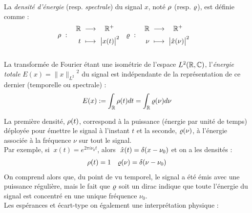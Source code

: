 \begin{definition}\label{def:densi_dE}
	La \emph{densité d'énergie} (resp. \emph{spectrale}) du signal $x$, noté $\rho$ (resp. $\varrho$), est définie comme :
	\begin{align}\label{eq:densi_dE}
		\densit\ &:\quad \begin{aligned}\R\ &\lr\quad \R^+ \\ t\ &\longmapsto\ \big|x(t)\big|^2 \end{aligned}  
		&
		\densis\ &:\quad \begin{aligned}\R\ &\lr\quad \R^+ \\ \nu\ &\longmapsto\ \big|\fou{x}(\nu)\big|^2 \end{aligned}
	\end{align}
	\\
	La transformée de Fourier étant une isométrie de l'espace $L^2(\mathbb{R},\mathbb{C})$, l'\emph{énergie totale} $E(x)={\|x\|_{L^2}}^2$ du signal est indépendante de la représentation de ce dernier (temporelle ou spectrale) :
	\begin{equation}\label{eq:parceval}
		E(x) :=  \int_{\mathbb{R}} \rho(t) dt = \int_{\mathbb{R}} \varrho(\nu) d\nu
	\end{equation}
\end{definition}
\skipl

La première densité, $\rho(t)$, correspond à la puissance (énergie par unité de temps) déployée pour émettre le signal à l'instant $t$ et la seconde, $\varrho(\nu)$, à l'énergie associée à la fréquence $\nu$ sur tout le signal. 
\\
Par exemple, si $\ x(t)=e^{2\pi i\nu_0 t}$, alors $\ \hat{x}(t) = \delta(x-\nu_0)$ et on a les densités :
\begin{align*}
	\rho(t) &= 1  &  \varrho(\nu) = \delta(\nu-\nu_0)
\end{align*}
On comprend alors que, du point de vu temporel, le signal a été émis avec une puissance régulière, mais le fait que $\varrho$ soit un dirac indique que toute l'énergie du signal est concentré en une unique fréquence $\nu_0$.
\\

Les espérances et écart-type on également une interprétation physique :

